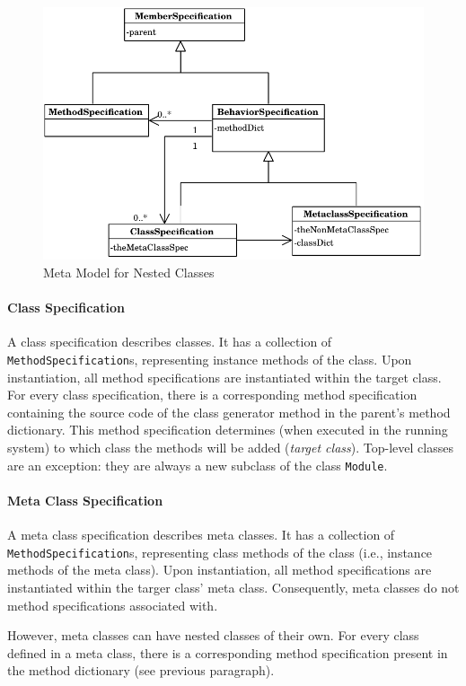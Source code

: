 \begin{figure}[!hbp]
	\centering
	\includegraphics[scale=0.75]{metamodel.pdf}
	\caption{Meta Model for Nested Classes}
	\label{fig:impl_meta_model}
\end{figure}

\paragraph{Class Specification}
A class specification describes classes. It has a collection of \texttt{MethodSpecification}s, representing instance methods of the class. Upon instantiation, all method specifications are instantiated within the target class. For every class specification, there is a corresponding method specification containing the source code of the class generator method in the parent's method dictionary. This method specification determines (when executed in the running system) to which class the methods will be added (\emph{target class}). Top-level classes are an exception: they are always a new subclass of the class \texttt{Module}.

\paragraph{Meta Class Specification}
A meta class specification describes meta classes. It has a collection of \texttt{MethodSpecification}s, representing class methods of the class (i.e., instance methods of the meta class). Upon instantiation, all method specifications are instantiated within the targer class' meta class. Consequently, meta classes do not method specifications associated with.

However, meta classes can have nested classes of their own. For every class defined in a meta class, there is a corresponding method specification present in the method dictionary (see previous paragraph).

